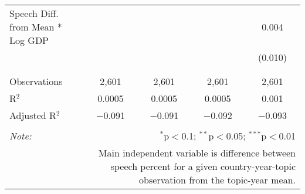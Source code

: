 \begin{table}[!htbp]
\begin{tabular}{@{\extracolsep{5pt}}lcccc}
 Speech Diff. from Mean * Log GDP &  &  &  & 0.004 \\ 
  &  &  &  & (0.010) \\ 
  & & & & \\ 
\hline \\[-1.8ex] 
Observations & 2,601 & 2,601 & 2,601 & 2,601 \\ 
R$^{2}$ & 0.0005 & 0.0005 & 0.0005 & 0.001 \\ 
Adjusted R$^{2}$ & $-$0.091 & $-$0.091 & $-$0.092 & $-$0.093 \\ 
\hline 
\hline \\[-1.8ex] 
\textit{Note:}  & \multicolumn{4}{r}{$^{*}$p$<$0.1; $^{**}$p$<$0.05; $^{***}$p$<$0.01} \\ 
 & \multicolumn{4}{r}{Main independent variable is difference between speech percent for a given country-year-topic observation from the topic-year mean.} \\ 
\end{tabular} 
\end{table} 
